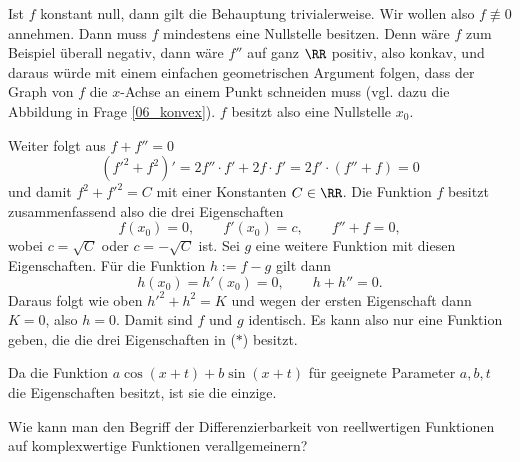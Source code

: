 \begin{antwort}
Ist $f$ konstant null, dann gilt die Behauptung trivialerweise. 
Wir wollen also $f\not\equiv 0$ annehmen. Dann muss $f$ mindestens eine 
Nullstelle besitzen. Denn wäre $f$ zum Beispiel überall negativ, dann 
wäre $f''$ auf ganz $\RR$ positiv, also konkav, und daraus 
würde mit einem einfachen geometrischen Argument folgen, dass der 
Graph von $f$ die $x$-Achse an einem Punkt schneiden muss (vgl. dazu 
die Abbildung in Frage \ref{06_konvex}). $f$ besitzt also eine 
Nullstelle $x_0$.       

Weiter folgt aus $f+f''=0$  
\[
( f'^2 + f^2 )' = 2f''\cdot f' + 2f\cdot f'= 2f'\cdot (f''+f )= 0
\]
und damit $f^2+f'^2 = C$ mit einer Konstanten $C\in \RR$. 
Die Funktion $f$ besitzt zusammenfassend also die drei Eigenschaften
\[
f( x_0 ) = 0, \qquad f'(x_0) = c, \qquad  
f'' + f=0,
\]  
wobei $c=\sqrt{C}$ oder $c=-\sqrt{C}$ ist. Sei $g$ eine weitere Funktion 
mit diesen Eigenschaften. Für die Funktion $ h := f-g$ gilt dann
\[
h(x_0)=h'(x_0)=0, \qquad h+h''=0.
\]
Daraus folgt wie oben $h'^2 + h^2 = K$ und wegen der ersten Eigenschaft 
dann $K=0$, also $h=0$. Damit sind $f$ und $g$ identisch. Es kann also nur 
eine Funktion geben, die die drei Eigenschaften in ($\ast$) besitzt. 

Da die Funktion $a \cos( x+ t)+b \sin(x+t)$ für geeignete 
Parameter $a,b,t$ die Eigenschaften besitzt, ist sie 
die einzige. 
\AntEnd  
\end{antwort}  

\begin{frage}
Wie kann man den Begriff der Differenzierbarkeit von reellwertigen 
Funktionen auf komplexwertige Funktionen verallgemeinern?
\end{frage}

